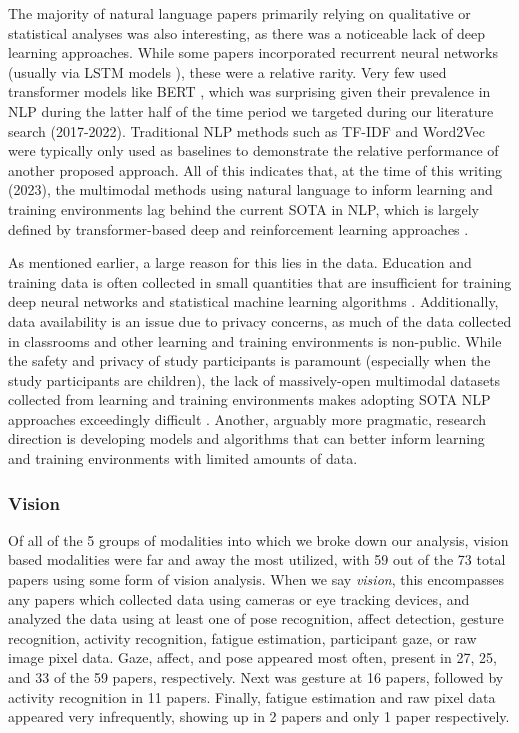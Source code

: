 \documentclass[manuscript,screen,review]{acmart}
\begin{document}
The majority of natural language papers primarily relying on qualitative or statistical analyses was also interesting, as there was a noticeable lack of deep learning approaches. While some papers incorporated recurrent neural networks (usually via LSTM models \cite{hochreiter1997long}), these were a relative rarity. Very few used transformer \cite{vaswani2017attention} models like BERT \cite{devlin2018bert}, which was surprising given their prevalence in NLP during the latter half of the time period we targeted during our literature search (2017-2022). Traditional NLP methods such as TF-IDF and Word2Vec \cite{mikolov2013efficient} were typically only used as baselines to demonstrate the relative performance of another proposed approach. All of this indicates that, at the time of this writing (2023), the multimodal methods using natural language to inform learning and training environments lag behind the current SOTA in NLP, which is largely defined by transformer-based deep and reinforcement learning approaches \cite{touvron2023llama}.

As mentioned earlier, a large reason for this lies in the data. Education and training data is often collected in small quantities \cite{snyder2023using,snyder2023analyzing} that are insufficient for training deep neural networks and statistical machine learning algorithms \cite{957160695}. Additionally, data availability is an issue due to privacy concerns, as much of the data collected in classrooms and other learning and training environments is non-public. While the safety and privacy of study participants is paramount (especially when the study participants are children), the lack of massively-open multimodal datasets collected from learning and training environments makes adopting SOTA NLP approaches exceedingly difficult \cite{3796643912}. Another, arguably more pragmatic, research direction is developing models and algorithms that can better inform learning and training environments with limited amounts of data.

\subsubsection{Vision}
Of all of the 5 groups of modalities into which we broke down our analysis, vision based modalities were far and away the most utilized, with 59 out of the 73 total papers using some form of vision analysis. When we say \textit{vision}, this encompasses any papers which collected data using cameras or eye tracking devices, and analyzed the data using at least one of pose recognition, affect detection, gesture recognition, activity recognition, fatigue estimation, participant gaze, or raw image pixel data. Gaze, affect, and pose appeared most often, present in 27, 25, and 33 of the 59 papers, respectively. Next was gesture at 16 papers, followed by activity recognition in 11 papers. Finally, fatigue estimation and raw pixel data appeared very infrequently, showing up in 2 papers and only 1 paper respectively.
\end{document}
